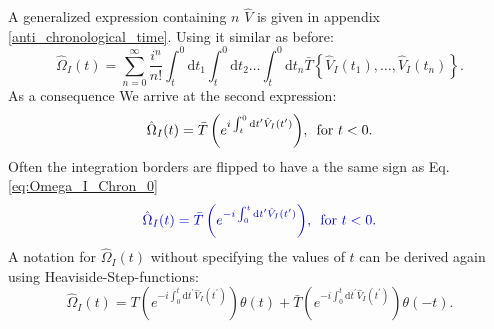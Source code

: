 \documentclass[12pt, titlepage]{article}
\begin{document}
A generalized expression containing $ n $ $ \hat{V} $ is given in appendix \ref{anti_chronological_time}.
Using it similar as before:
\begin{equation}
\hat{\Omega}_{I}(t) =
\sum\limits_{n=0}^{\infty} 
\frac{i^{n}}{n!}
\int^{0}_{t}\mathrm{d}t_1\int^{0}_{t}\! \! \mathrm{d}t_2
 \ldots
 \int^{0}_{t}\! \! \mathrm{d}t_n
 \bar{T}\left\lbrace \hat{V}_{I}(t_1), \ldots , \hat{V}_{I}(t_n)\right\rbrace .
\end{equation}
As a consequence We arrive at the second expression:\begin{equation}\label{eq:Omega_I_Chron1_0<}
\hat{\Omega}_{I}(t)
= \bar{T}\left( e^{i\int^{0}_{t}\mathrm{d}t^{\prime} \hat{V}_{I}(t^{\prime})} \right)
	\! ,\text{\enskip for  }  t<0 
	.
\end{equation}
Often the integration borders are flipped to have a the same sign as Eq.\enskip\eqref{eq:Omega_I_Chron_0}
\begin{equation}\label{eq:Omega_I_Chron_0<}
\textcolor[RGB]{0,0,204}{
\hat{\Omega}_{I}(t)
= \bar{T}\left( e^{-i\int_{0}^{t}\mathrm{d}t^{\prime} \hat{V}_{I}(t^{\prime})} \right)
	\! ,\text{\enskip for  }  t<0 
	.}
\end{equation}
A notation for $ \hat{\Omega}_{I}(t) $ without specifying the values of $ t $ can be derived again using Heaviside-Step-functions:
\begin{equation}
\hat{\Omega}_{I}(t)
=T\left( e^{-i\int_{0}^{t}\mathrm{d}t^{\prime} \hat{V}_{I}(t^{\prime})} \right)
\theta(t)
+
 \bar{T}\left( e^{-i\int_{0}^{t}\mathrm{d}t^{\prime} \hat{V}_{I}(t^{\prime})} \right)
 \theta(-t)
 .
\end{equation}
\end{document}
